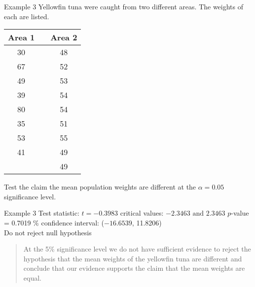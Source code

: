 \documentclass[t]{beamer}
\begin{document}
\begin{frame}{Example 3}
Yellowfin tuna were caught from two different areas. The weights of each are listed.	
\begin{center}
\begin{tabular}{cp{}c}
\textbf{Area 1} & & \textbf{Area 2} \\ \hline
30 & & 48 \\
67 & & 52 \\
49 & & 53 \\
39 & & 54 \\
80 & & 54 \\
35 & & 51 \\
53 & & 55  \\
41 & & 49 \\
	& & 49 \\
\end{tabular}
\end{center}
Test the claim the mean population weights are different at the $\alpha = 0.05$ significance level.
\end{frame}

\begin{frame}{Example 3}
Test statistic: $t = -0.3983$ \quad critical values: $-2.3463 \text{ and } 2.3463$	\newline
$p$-value = 0.7019	\% confidence interval: ($-16.6539$, 11.8206)	\newline\\	\pause
Do not reject null hypothesis	\pause \newline\\
\begin{quote}
At the 5\% significance level we do not have sufficient evidence to reject the hypothesis that the mean weights of the yellowfin tuna are different and conclude that our evidence supports the claim that the mean weights are equal.
\end{quote}
\end{frame}
\end{document}
